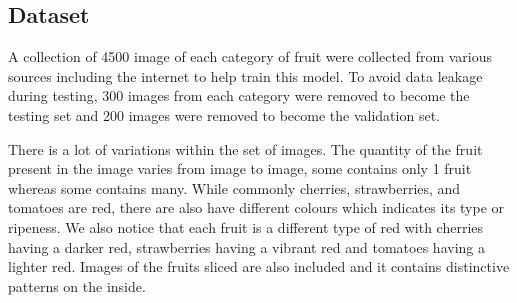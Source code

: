 \documentclass[../main.tex]{subfiles}
\begin{document}
\subsection{Dataset}

A collection of 4500 image of each category of fruit were collected from various sources including the internet to help train this model. To avoid data leakage during testing, 300 images from each category were removed to become the testing set and 200 images were removed to become the validation set. 

There is a lot of variations within the set of images. The quantity of the fruit present in the image varies from image to image, some contains only 1 fruit whereas some contains many. While commonly cherries, strawberries, and tomatoes are red, there are also have different colours which indicates its type or ripeness. We also notice that each fruit is a different type of red with cherries having a darker red, strawberries having a vibrant red and tomatoes having a lighter red. Images of the fruits sliced are also included and it contains distinctive patterns on the inside.  
\end{document}
